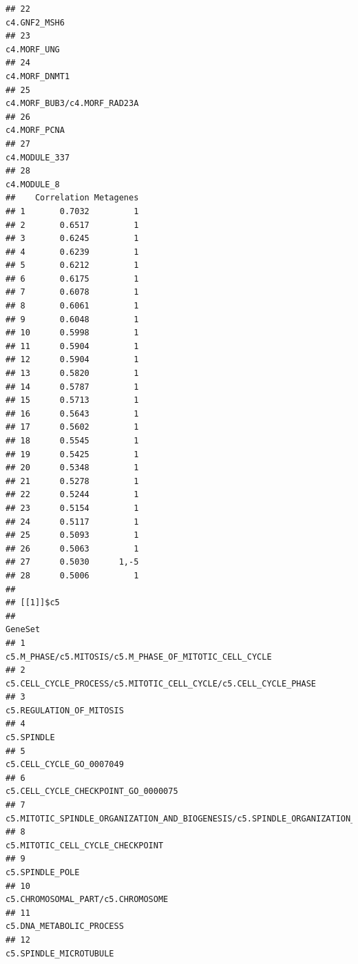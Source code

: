 \documentclass{article}\usepackage[]{graphicx}\usepackage[]{color}
\makeatletter
\newenvironment{kframe}{%
 \def\at@end@of@kframe{}%
 \ifinner\ifhmode%
  \def\at@end@of@kframe{\end{minipage}}%
  \begin{minipage}{\columnwidth}%
 \fi\fi%
 \def\FrameCommand##1{\hskip\@totalleftmargin \hskip-\fboxsep
 \colorbox{shadecolor}{##1}\hskip-\fboxsep
     \hskip-\linewidth \hskip-\@totalleftmargin \hskip\columnwidth}%
 \MakeFramed {\advance\hsize-\width
   \@totalleftmargin\z@ \linewidth\hsize
   \@setminipage}}%
 {\par\unskip\endMakeFramed%
 \at@end@of@kframe}
\newenvironment{knitrout}{}{} %
\makeatother
\begin{document}
\begin{knitrout}
\begin{kframe}
\begin{verbatim}
## 22                                                                    c4.GNF2_MSH6
## 23                                                                     c4.MORF_UNG
## 24                                                                   c4.MORF_DNMT1
## 25                                                     c4.MORF_BUB3/c4.MORF_RAD23A
## 26                                                                    c4.MORF_PCNA
## 27                                                                   c4.MODULE_337
## 28                                                                     c4.MODULE_8
##    Correlation Metagenes
## 1       0.7032         1
## 2       0.6517         1
## 3       0.6245         1
## 4       0.6239         1
## 5       0.6212         1
## 6       0.6175         1
## 7       0.6078         1
## 8       0.6061         1
## 9       0.6048         1
## 10      0.5998         1
## 11      0.5904         1
## 12      0.5904         1
## 13      0.5820         1
## 14      0.5787         1
## 15      0.5713         1
## 16      0.5643         1
## 17      0.5602         1
## 18      0.5545         1
## 19      0.5425         1
## 20      0.5348         1
## 21      0.5278         1
## 22      0.5244         1
## 23      0.5154         1
## 24      0.5117         1
## 25      0.5093         1
## 26      0.5063         1
## 27      0.5030      1,-5
## 28      0.5006         1
## 
## [[1]]$c5
##                                                                                  GeneSet
## 1                                 c5.M_PHASE/c5.MITOSIS/c5.M_PHASE_OF_MITOTIC_CELL_CYCLE
## 2                        c5.CELL_CYCLE_PROCESS/c5.MITOTIC_CELL_CYCLE/c5.CELL_CYCLE_PHASE
## 3                                                               c5.REGULATION_OF_MITOSIS
## 4                                                                             c5.SPINDLE
## 5                                                               c5.CELL_CYCLE_GO_0007049
## 6                                                    c5.CELL_CYCLE_CHECKPOINT_GO_0000075
## 7  c5.MITOTIC_SPINDLE_ORGANIZATION_AND_BIOGENESIS/c5.SPINDLE_ORGANIZATION_AND_BIOGENESIS
## 8                                                       c5.MITOTIC_CELL_CYCLE_CHECKPOINT
## 9                                                                        c5.SPINDLE_POLE
## 10                                                     c5.CHROMOSOMAL_PART/c5.CHROMOSOME
## 11                                                              c5.DNA_METABOLIC_PROCESS
## 12                                                                c5.SPINDLE_MICROTUBULE

\end{verbatim}
\end{kframe}
\end{knitrout}
\end{document}
